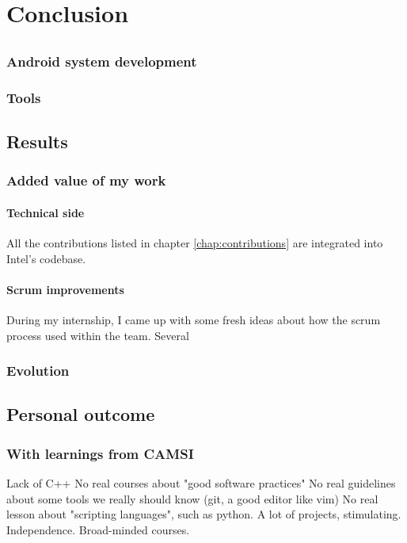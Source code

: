 \chapter{Conclusion}

\section{}
\subsection{Android system development}
\subsection{Tools}

\section{Results}

\subsection{Added value of my work}
\subsubsection{Technical side}
All the contributions listed in chapter \ref{chap:contributions} are integrated into Intel's codebase.
\subsubsection{Scrum improvements}
During my internship, I came up with some fresh ideas about how the \gls{scrum} process used within the team.
Several

\subsection{Evolution}


\section{Personal outcome}

\subsection{With learnings from CAMSI}
Lack of C++
No real courses about "good software practices"
No real guidelines about some tools we really should know (\gls{git}, a good editor like \gls{vim})
No real lesson about "scripting languages", such as python.
A lot of projects, stimulating. Independence. Broad-minded courses.

